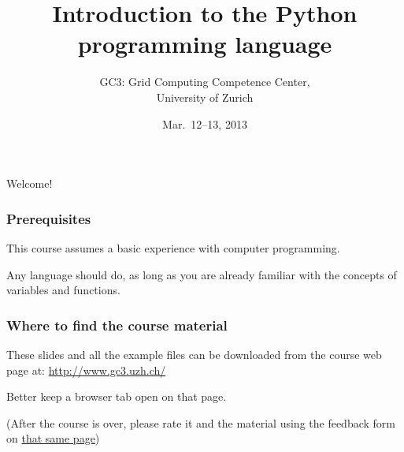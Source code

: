 \documentclass[english,serif,mathserif,xcolor=pdftex,dvipsnames,table]{beamer}
\title[Introduction]{%
  Introduction to the Python programming language
}
\author[GC3]{%
  GC3: Grid Computing Competence Center, \\
  University of Zurich
}
\date{Mar.~12--13, 2013}
\begin{document}
\maketitle

\begin{frame}
  \begin{center}
    {\Huge Welcome!}
  \end{center}
\end{frame}


\begin{frame}
  \frametitle{Prerequisites}
  This course assumes a basic experience with computer programming.

  \+
  Any language should do, as long as you are already familiar with
  the concepts of variables and functions.
\end{frame}


\begin{frame}
  \frametitle{Where to find the course material}

  These slides and all the example files can be downloaded from the
  course web page at:
  {\small\url{http://www.gc3.uzh.ch/}}

  \+
  Better keep a browser tab open on that page.

  \+
  (After the course is over, please rate it and the material using
  the feedback form on \href{http://www.gc3.uzh.ch/}{that
    same page})
\end{frame}
\end{document}
